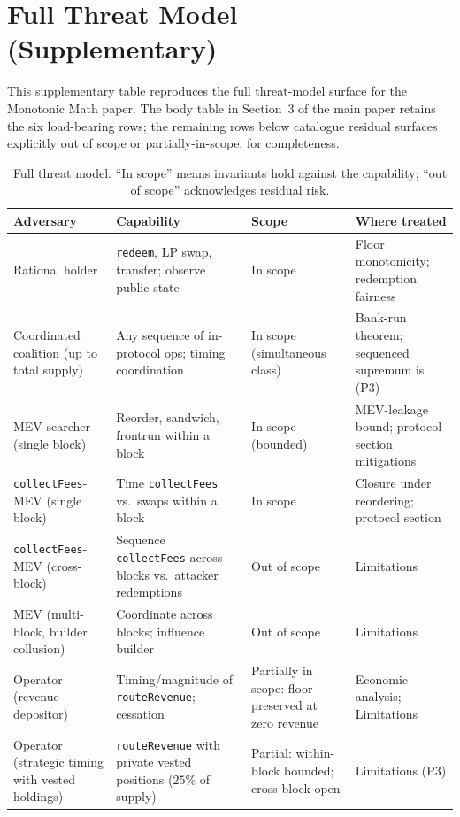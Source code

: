 \documentclass[11pt,a4paper]{article}
\begin{document}
\section*{Full Threat Model (Supplementary)}

This supplementary table reproduces the full threat-model surface for the
Monotonic Math paper. The body table in Section~3 of the main paper retains
the six load-bearing rows; the remaining rows below catalogue residual
surfaces explicitly out of scope or partially-in-scope, for completeness.

\begin{table}[h]
\centering
\scriptsize
\setlength{\tabcolsep}{4pt}
\renewcommand{\arraystretch}{0.95}
\caption{Full threat model. ``In scope'' means invariants hold against the capability; ``out of scope'' acknowledges residual risk.}
\label{tab:threat-model-full}
\begin{tabular}{p{2.4cm} p{4.6cm} p{1.9cm} p{4.0cm}}
\toprule
\textbf{Adversary} & \textbf{Capability} & \textbf{Scope} & \textbf{Where treated} \\
\midrule
Rational holder & \texttt{redeem}, LP swap, transfer; observe public state & In scope & Floor monotonicity; redemption fairness \\
Coordinated coalition (up to total supply) & Any sequence of in-protocol ops; timing coordination & In scope (simultaneous class) & Bank-run theorem; sequenced supremum is (P3) \\
MEV searcher (single block) & Reorder, sandwich, frontrun within a block & In scope (bounded) & MEV-leakage bound; protocol-section mitigations \\
\texttt{collectFees}-MEV (single block) & Time \texttt{collectFees} vs.\ swaps within a block & In scope & Closure under reordering; protocol section \\
\texttt{collectFees}-MEV (cross-block) & Sequence \texttt{collectFees} across blocks vs.\ attacker redemptions & Out of scope & Limitations \\
MEV (multi-block, builder collusion) & Coordinate across blocks; influence builder & Out of scope & Limitations \\
Operator (revenue depositor) & Timing/magnitude of \texttt{routeRevenue}; cessation & Partially in scope: floor preserved at zero revenue & Economic analysis; Limitations \\
Operator (strategic timing with vested holdings) & \texttt{routeRevenue} with private vested positions ($25\%$ of supply) & Partial: within-block bounded; cross-block open & Limitations (P3) \\

\end{tabular}
\end{table}
\end{document}
